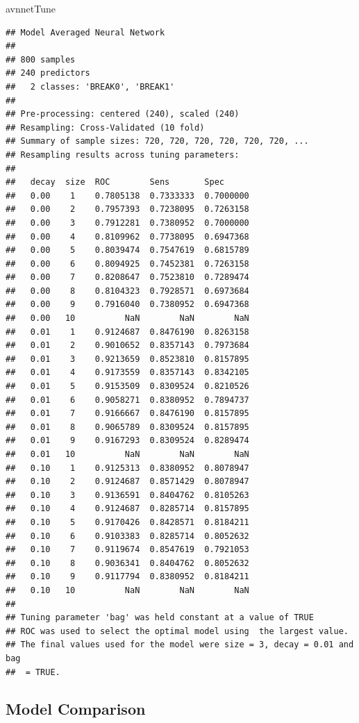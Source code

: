 \documentclass[]{book}
\newenvironment{Shaded}{\begin{snugshade}}{\end{snugshade}}
\newcommand{\NormalTok}[1]{{#1}}
\theoremstyle{definition}
\theoremstyle{definition}
\theoremstyle{remark}
\begin{document}
\begin{Shaded}
\begin{Highlighting}[]
\NormalTok{avnnetTune}
\end{Highlighting}
\end{Shaded}

\begin{verbatim}
## Model Averaged Neural Network 
## 
## 800 samples
## 240 predictors
##   2 classes: 'BREAK0', 'BREAK1' 
## 
## Pre-processing: centered (240), scaled (240) 
## Resampling: Cross-Validated (10 fold) 
## Summary of sample sizes: 720, 720, 720, 720, 720, 720, ... 
## Resampling results across tuning parameters:
## 
##   decay  size  ROC        Sens       Spec     
##   0.00    1    0.7805138  0.7333333  0.7000000
##   0.00    2    0.7957393  0.7238095  0.7263158
##   0.00    3    0.7912281  0.7380952  0.7000000
##   0.00    4    0.8109962  0.7738095  0.6947368
##   0.00    5    0.8039474  0.7547619  0.6815789
##   0.00    6    0.8094925  0.7452381  0.7263158
##   0.00    7    0.8208647  0.7523810  0.7289474
##   0.00    8    0.8104323  0.7928571  0.6973684
##   0.00    9    0.7916040  0.7380952  0.6947368
##   0.00   10          NaN        NaN        NaN
##   0.01    1    0.9124687  0.8476190  0.8263158
##   0.01    2    0.9010652  0.8357143  0.7973684
##   0.01    3    0.9213659  0.8523810  0.8157895
##   0.01    4    0.9173559  0.8357143  0.8342105
##   0.01    5    0.9153509  0.8309524  0.8210526
##   0.01    6    0.9058271  0.8380952  0.7894737
##   0.01    7    0.9166667  0.8476190  0.8157895
##   0.01    8    0.9065789  0.8309524  0.8157895
##   0.01    9    0.9167293  0.8309524  0.8289474
##   0.01   10          NaN        NaN        NaN
##   0.10    1    0.9125313  0.8380952  0.8078947
##   0.10    2    0.9124687  0.8571429  0.8078947
##   0.10    3    0.9136591  0.8404762  0.8105263
##   0.10    4    0.9124687  0.8285714  0.8157895
##   0.10    5    0.9170426  0.8428571  0.8184211
##   0.10    6    0.9103383  0.8285714  0.8052632
##   0.10    7    0.9119674  0.8547619  0.7921053
##   0.10    8    0.9036341  0.8404762  0.8052632
##   0.10    9    0.9117794  0.8380952  0.8184211
##   0.10   10          NaN        NaN        NaN
## 
## Tuning parameter 'bag' was held constant at a value of TRUE
## ROC was used to select the optimal model using  the largest value.
## The final values used for the model were size = 3, decay = 0.01 and bag
##  = TRUE.
\end{verbatim}

\subsection{Model Comparison}\label{model-comparison}
\end{document}
